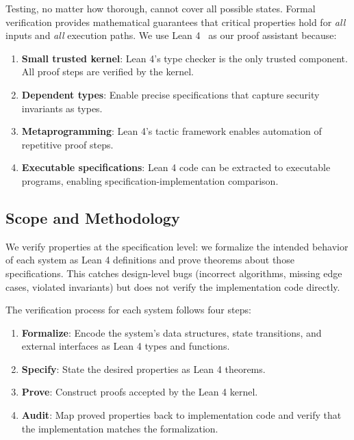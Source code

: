 \documentclass[11pt]{article}
\begin{document}
Testing, no matter how thorough, cannot cover all possible states. Formal
verification provides mathematical guarantees that critical properties hold
for \emph{all} inputs and \emph{all} execution paths. We use Lean
4~\cite{lean4} as our proof assistant because:
\begin{enumerate}[leftmargin=1.4em]
    \item \textbf{Small trusted kernel}: Lean 4's type checker is the only
    trusted component. All proof steps are verified by the kernel.
    \item \textbf{Dependent types}: Enable precise specifications that capture
    security invariants as types.
    \item \textbf{Metaprogramming}: Lean 4's tactic framework enables
    automation of repetitive proof steps.
    \item \textbf{Executable specifications}: Lean 4 code can be extracted to
    executable programs, enabling specification-implementation comparison.
\end{enumerate}

\subsection{Scope and Methodology}

We verify properties at the specification level: we formalize the intended
behavior of each system as Lean 4 definitions and prove theorems about those
specifications. This catches design-level bugs (incorrect algorithms, missing
edge cases, violated invariants) but does not verify the implementation code
directly.

The verification process for each system follows four steps:
\begin{enumerate}[leftmargin=1.4em]
    \item \textbf{Formalize}: Encode the system's data structures, state
    transitions, and external interfaces as Lean 4 types and functions.
    \item \textbf{Specify}: State the desired properties as Lean 4 theorems.
    \item \textbf{Prove}: Construct proofs accepted by the Lean 4 kernel.
    \item \textbf{Audit}: Map proved properties back to implementation code
    and verify that the implementation matches the formalization.
\end{enumerate}

\end{document}
